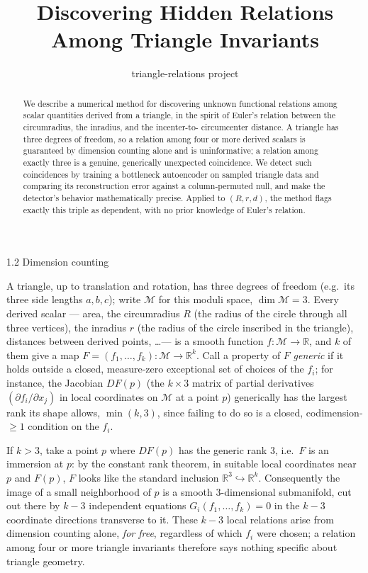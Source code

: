 \documentclass[11pt,reqno]{amsart}
\title[Discovering Hidden Relations Among Triangle Invariants]%
{Discovering Hidden Relations\\[3pt] Among Triangle Invariants}
\author{triangle-relations project}
\date{}
\makeatletter
\renewcommand\section{\@startsection{section}{1}%
  \z@{3\linespacing\@plus1.2\linespacing\@minus.6\linespacing}%
  {1.2\linespacing}%
  {\normalfont\large\scshape\centering}}
\numberwithin{equation}{section}
\theoremstyle{definition}
\theoremstyle{remark}
\newcommand{\M}{\mathcal{M}}
\makeatother
\begin{document}
\begin{abstract}
We describe a numerical method for discovering unknown functional relations
among scalar quantities derived from a triangle, in the spirit of Euler's
relation between the circumradius, the inradius, and the incenter-to-
circumcenter distance. A triangle has three degrees of freedom, so a
relation among four or more derived scalars is guaranteed by dimension
counting alone and is uninformative; a relation among exactly three is a
genuine, generically unexpected coincidence. We detect such coincidences by
training a bottleneck autoencoder on sampled triangle data and comparing its
reconstruction error against a column-permuted null, and make the detector's
behavior mathematically precise. Applied to $(R,r,d)$, the method flags
exactly this triple as dependent, with no prior knowledge of Euler's
relation.
\end{abstract}

\maketitle

\section{Dimension counting}
\label{sec:setup}

A triangle, up to translation and rotation, has three degrees of freedom
(e.g.\ its three side lengths $a,b,c$); write $\M$ for this moduli space,
$\dim\M=3$. Every derived scalar --- area, the circumradius $R$ (the radius
of the circle through all three vertices), the inradius $r$ (the radius of
the circle inscribed in the triangle), distances between derived points,
\dots --- is a smooth function $f:\M\to\mathbb R$, and $k$ of them give a map
$F=(f_1,\dots,f_k):\M\to\mathbb R^k$. Call a property of $F$ \emph{generic}
if it holds outside a closed, measure-zero exceptional set of choices of the
$f_i$; for instance, the Jacobian $DF(p)$ (the $k\times3$ matrix of partial
derivatives $(\partial f_i/\partial x_j)$ in local coordinates on $\M$ at a
point $p$) generically has the largest rank its shape allows, $\min(k,3)$,
since failing to do so is a closed, codimension-$\ge1$ condition on the
$f_i$.

If $k>3$, take a point $p$ where $DF(p)$ has the generic rank $3$, i.e.\
$F$ is an immersion at $p$: by the constant rank theorem, in suitable local
coordinates near $p$ and $F(p)$, $F$ looks like the standard inclusion
$\mathbb R^3\hookrightarrow\mathbb R^k$. Consequently the image of a small
neighborhood of $p$ is a smooth $3$-dimensional submanifold, cut out there
by $k-3$ independent equations $G_i(f_1,\dots,f_k)=0$ in the $k-3$
coordinate directions transverse to it. These $k-3$ local relations arise
from dimension counting alone, \emph{for free}, regardless of which $f_i$
were chosen; a relation among four or more triangle invariants therefore
says nothing specific about triangle geometry.
\end{document}
